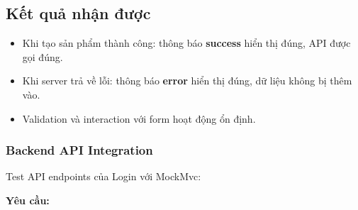 \documentclass[a4paper,12pt]{article}
\begin{document}
\subsection*{Kết quả nhận được}
\begin{itemize}
    \item Khi tạo sản phẩm thành công: thông báo \textbf{success} hiển thị đúng, API được gọi đúng.
    \item Khi server trả về lỗi: thông báo \textbf{error} hiển thị đúng, dữ liệu không bị thêm vào.
    \item Validation và interaction với form hoạt động ổn định.
\end{itemize}


\subsubsection{Backend API Integration}

Test API endpoints của Login với MockMvc:

\textbf{Yêu cầu:}
\end{document}
